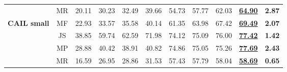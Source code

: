\begin{table*}[htbp]
\begin{tabular}{@{}c|c|cccc|cc|c|c|c@{}}
                                          & MR                                & 20.11                    & 30.23                    & 32.49                   & 39.66                   & 54.73                                                     & 57.77                                                    & 62.03                                                                                      & \underline{\textbf{64.90}}                                                                & \textbf{2.87}                     \\
        \textbf{CAIL small}               & MF                               & 22.93                    & 33.57                    & 35.58                   & 40.14                   & 61.35                                                     & 63.98                                                    & 67.42                                                                                      & \underline{\textbf{69.49}}                                                                & \textbf{2.07}                     \\
                                          & JS                                & 38.85                    & 59.74                    & 62.59                   & 71.98                   & 74.12                                                     & 75.09                                                    & 76.00                                                                                      & \underline{\textbf{77.42}}                                                                & \textbf{1.42}                     \\
                                          & MP                                & 28.88                    & 40.42                    & 38.91                   & 40.82                   & 74.86                                                     & 75.05                                                    & 75.26                                                                                     & \underline{\textbf{77.69}}                                                                & \textbf{2.43}                     \\
                                          & MR                                & 16.59                    & 26.95                    & 28.86                   & 31.53                   & 57.43                                                     & 57.79                                                    & 58.04                                                                                      & \underline{\textbf{58.69}}                                                                & \textbf{0.65}                     \\

\end{tabular}
\end{table*}
